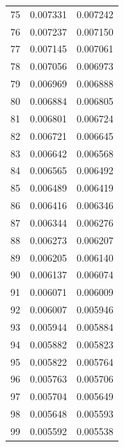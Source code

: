 \begin{tabular}{lrr}
75 & 0.007331 & 0.007242 \\
76 & 0.007237 & 0.007150 \\
77 & 0.007145 & 0.007061 \\
78 & 0.007056 & 0.006973 \\
79 & 0.006969 & 0.006888 \\
80 & 0.006884 & 0.006805 \\
81 & 0.006801 & 0.006724 \\
82 & 0.006721 & 0.006645 \\
83 & 0.006642 & 0.006568 \\
84 & 0.006565 & 0.006492 \\
85 & 0.006489 & 0.006419 \\
86 & 0.006416 & 0.006346 \\
87 & 0.006344 & 0.006276 \\
88 & 0.006273 & 0.006207 \\
89 & 0.006205 & 0.006140 \\
90 & 0.006137 & 0.006074 \\
91 & 0.006071 & 0.006009 \\
92 & 0.006007 & 0.005946 \\
93 & 0.005944 & 0.005884 \\
94 & 0.005882 & 0.005823 \\
95 & 0.005822 & 0.005764 \\
96 & 0.005763 & 0.005706 \\
97 & 0.005704 & 0.005649 \\
98 & 0.005648 & 0.005593 \\
99 & 0.005592 & 0.005538 \\
\bottomrule
\end{tabular}
